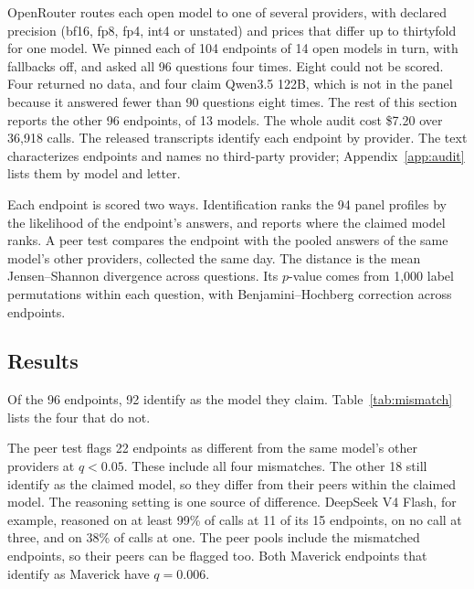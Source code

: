 \documentclass[11pt]{article}
\begin{document}
OpenRouter routes each open model to one of several providers, with declared precision (bf16,
fp8, fp4, int4 or unstated) and prices that differ up to thirtyfold for one model. We pinned each
of 104 endpoints of 14 open models in turn, with fallbacks off, and asked all 96 questions four
times. Eight could not be scored. Four returned no data, and four claim Qwen3.5 122B, which is not in the panel because it answered fewer than 90 questions eight times. The rest of this
section reports the other 96 endpoints, of 13 models. The whole audit cost \$7.20 over 36,918
calls. The released transcripts identify each endpoint by provider. The text characterizes
endpoints and names no third-party provider; Appendix~\ref{app:audit} lists them by model and
letter.

Each endpoint is scored two ways. Identification ranks the 94 panel profiles by the likelihood of
the endpoint's answers, and reports where the claimed model ranks. A peer test compares the
endpoint with the pooled answers of the same model's other providers, collected the same day. The
distance is the mean Jensen--Shannon divergence across questions. Its $p$-value comes from 1,000
label permutations within each question, with Benjamini--Hochberg correction across endpoints.

\subsection{Results}
\label{sec:results}

Of the 96 endpoints, 92 identify as the model they claim. Table~\ref{tab:mismatch} lists the four
that do not.

The peer test flags 22 endpoints as different from the same model's other providers at
$q < 0.05$. These include all four mismatches. The other 18 still identify as the claimed model,
so they differ from their peers within the claimed model. The reasoning setting is one source of
difference. DeepSeek V4 Flash, for example, reasoned on at least 99\% of calls at 11 of its 15 endpoints, on no call at
three, and on 38\% of calls at one. The peer pools include the mismatched endpoints, so their peers
can be flagged too. Both Maverick endpoints that identify as Maverick have $q = 0.006$.
\end{document}

